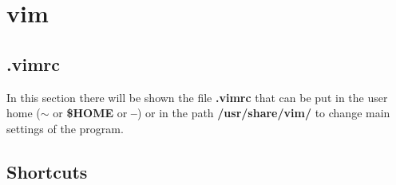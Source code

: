 \section{vim}
\subsection{.vimrc}
In this section there will be shown the file \textbf{.vimrc} that can be put in the user home (\textbf{$\sim$} or \textbf{\$HOME} or \textbf{--}) or in the path \textbf{/usr/share/vim/} to change main settings of the program.



\subsection{Shortcuts}

